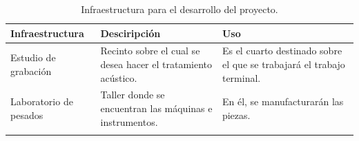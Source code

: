 \documentclass[letterpaper,12pt,oneside]{article}
\begin{document}
\begin{center}
\footnotesize
    \begin{longtable}[!htb]{| m{10em} | m{12em} | m{12em}|}
    \hline
    \textbf{Infraestructura}& \textbf{Desciripci\'on} & \textbf{Uso} \\
    \hline\hline
    Estudio de grabaci\'on & Recinto sobre el cual se desea hacer el tratamiento acústico. & Es el cuarto destinado sobre el que se trabajará el trabajo terminal.\\
    \hline
    Laboratorio de pesados & Taller donde se encuentran las máquinas e instrumentos. & En él, se manufacturarán las piezas.\\
    \hline

    \caption{Infraestructura para el desarrollo del proyecto.}
    \label{tab:Infraestructura}
    \end{longtable}
\end{center}
\end{document}
